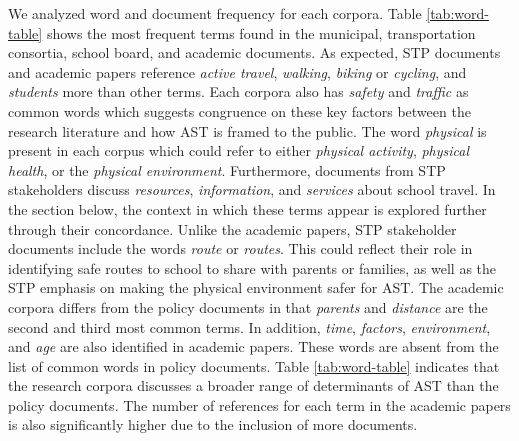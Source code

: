 \documentclass[]{elsarticle} %
\begin{document}
We analyzed word and document frequency for each corpora. Table
\ref{tab:word-table} shows the most frequent terms found in the
municipal, transportation consortia, school board, and academic
documents. As expected, STP documents and academic papers reference
\emph{active travel}, \emph{walking}, \emph{biking} or \emph{cycling},
and \emph{students} more than other terms. Each corpora also has
\emph{safety} and \emph{traffic} as common words which suggests
congruence on these key factors between the research literature and how
AST is framed to the public. The word \emph{physical} is present in each
corpus which could refer to either \emph{physical activity},
\emph{physical health}, or the \emph{physical environment}. Furthermore,
documents from STP stakeholders discuss \emph{resources},
\emph{information}, and \emph{services} about school travel. In the
section below, the context in which these terms appear is explored
further through their concordance. Unlike the academic papers, STP
stakeholder documents include the words \emph{route} or \emph{routes}.
This could reflect their role in identifying safe routes to school to
share with parents or families, as well as the STP emphasis on making
the physical environment safer for AST. The academic corpora differs
from the policy documents in that \emph{parents} and \emph{distance} are
the second and third most common terms. In addition, \emph{time},
\emph{factors}, \emph{environment}, and \emph{age} are also identified
in academic papers. These words are absent from the list of common words
in policy documents. Table \ref{tab:word-table} indicates that the
research corpora discusses a broader range of determinants of AST than
the policy documents. The number of references for each term in the
academic papers is also significantly higher due to the inclusion of
more documents.
\end{document}
